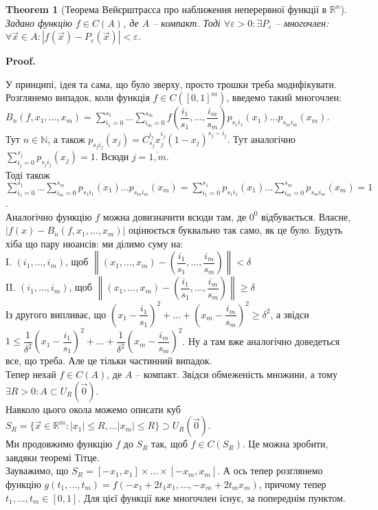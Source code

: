 \documentclass[a4paper, 10pt]{article}
\makeatletter
\def\qed{$\blacksquare$}
\theoremstyle{theoremdd}
\newtheorem{theorem}{Theorem}[subsection]
\theoremstyle{theoremdd}
\theoremstyle{theoremdd}
\theoremstyle{theoremdd}
\theoremstyle{theoremdd}
\theoremstyle{theoremdd}
\theoremstyle{theoremdd}
\theoremstyle{theoremdd}
\theoremstyle{theoremdd}
\theoremstyle{theoremdd}
\theoremstyle{theoremdd}
\theoremstyle{theoremdd}
\theoremstyle{theoremdd}
\theoremstyle{theoremdd}
\theoremstyle{theoremdd}
\renewenvironment{proof}[1][Proof.\\]{\par
\pushQED{\hfill \qed}%
\normalfont \topsep6\p@\@plus6\p@\relax
\trivlist
\item\relax
{\bfseries
#1\@addpunct{.}}\hspace\labelsep\ignorespaces
}{%
\popQED\endtrivlist\@endpefalse
}
\newcommand\Norm[1]{\left\lVert#1\right\rVert}
\makeatother
\begin{document}
\begin{theorem}[Теорема Вейєрштрасса про наближення неперервної функції в $\mathbb{R}^n$]
Задано функцію $f \in C(A)$, де $A$ -- компакт. Тоді $\forall \varepsilon > 0: \exists P_\varepsilon$ -- многочлен: $\forall \vec{x} \in A: |f(\vec{x}) - P_\varepsilon(\vec{x})| < \varepsilon$.
\end{theorem}

\begin{proof}
У принципі, ідея та сама, що було зверху, просто трошки треба модифікувати.\\
Розглянемо випадок, коли функція $f \in C([0,1]^m)$, введемо такий многочлен:\\
$B_n(f,x_1,\dots,x_m) = \displaystyle\sum_{i_1=0}^{s_1} \dots \sum_{i_m=0}^{s_m} f\left( \dfrac{i_1}{s_1},\dots,\dfrac{i_m}{s_m} \right) p_{s_1 i_1}(x_1) \dots p_{s_m i_m}(x_m)$.\\
Тут $n \in \mathbb{N}$, а також $p_{s_j i_j}(x_j) = C_{s_j}^{i_j} x_j^{i_j}(1-x_j)^{s_j-i_j}$. Тут аналогічно $\displaystyle\sum_{i_j=0}^{s_j} p_{s_ji_j}(x_j) = 1$. Всюди $j = \overline{1,m}$.\\
Тоді також $\displaystyle\sum_{i_1=0}^{s_1} \dots \sum_{i_m=0}^{s_m} p_{s_1i_1}(x_1) \dots p_{s_m i_m}(x_m) = \sum_{i_1=0}^{s_1} p_{s_1i_1}(x_1) \dots \sum_{i_m = 0}^{s_m} p_{s_m i_m}(x_m) = 1$.\\
Аналогічно функцію $f$ можна довизначити всюди там, де $0^0$ відбувається. Власне,\\
$|f(x) - B_n(f,x_1,\dots,x_m)|$ оцінюється буквально так само, як це було. Будуть хіба що пару нюансів: ми ділимо суму на: \\
I. $(i_1,\dots,i_m)$, щоб $\Norm{(x_1,\dots,x_m) - \left(\dfrac{i_1}{s_1},\dots,\dfrac{i_m}{s_m} \right)} < \delta$\\
II. $(i_1,\dots,i_m)$, щоб $\Norm{(x_1,\dots,x_m) - \left(\dfrac{i_1}{s_1},\dots,\dfrac{i_m}{s_m} \right)} \geq \delta$\\
Із другого випливає, що $\left( x_1 - \dfrac{i_1}{s_1}\right)^2 + \dots + \left( x_m - \dfrac{i_m}{s_m} \right)^2 \geq \delta^2$, а звідси\\
$1 \leq \dfrac{1}{\delta^2} \left( x_1 - \dfrac{i_1}{s_1}\right)^2 + \dots + \dfrac{1}{\delta^2} \left( x_m - \dfrac{i_m}{s_m}\right)^2$. Ну а там вже аналогічно доведеться все, що треба. Але це тільки частинний випадок.\\
Тепер нехай $f \in C(A)$, де $A$ -- компакт. Звідси обмеженість множини, а тому $\exists R > 0: A \subset U_R(\vec{0})$.\\
Навколо цього окола можемо описати куб $S_R = \{ \vec{x} \in \mathbb{R}^m: |x_1| \leq R, \dots |x_m| \leq R \} \supset U_R(\vec{0})$.\\
Ми продовжимо функцію $f$ до $S_R$ так, щоб $f \in C(S_R)$. Це можна зробити, завдяки теоремі Тітце.\\
Зауважимо, що $S_R = [-x_1,x_1] \times \dots \times [-x_m,x_m]$. А ось тепер розглянемо функцію $g(t_1,\dots,t_m) = f(-x_1+2t_1x_1, \dots, -x_m+2t_mx_m)$, причому тепер $t_1,\dots,t_m \in [0,1]$. Для цієї функції вже многочлен існує, за попереднім пунктом.
\end{proof}
\end{document}
